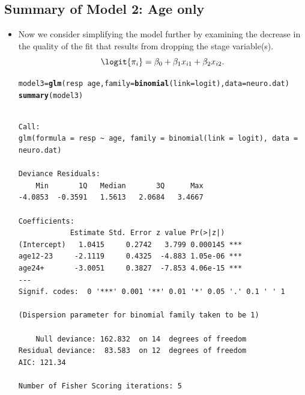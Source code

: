\documentclass[oneside]{book}\usepackage[]{graphicx}\usepackage[svgnames]{xcolor}
\makeatletter
\newcommand{\hlopt}[1]{\textcolor[rgb]{0,0,0}{#1}}%
\newcommand{\hlstd}[1]{\textcolor[rgb]{0.345,0.345,0.345}{#1}}%
\newcommand{\hlkwb}[1]{\textcolor[rgb]{0.69,0.353,0.396}{#1}}%
\newcommand{\hlkwc}[1]{\textcolor[rgb]{0.333,0.667,0.333}{#1}}%
\newcommand{\hlkwd}[1]{\textcolor[rgb]{0.737,0.353,0.396}{\textbf{#1}}}%
\newenvironment{kframe}{%
 \def\at@end@of@kframe{}%
 \ifinner\ifhmode%
  \def\at@end@of@kframe{\end{minipage}}%
  \begin{minipage}{\columnwidth}%
 \fi\fi%
 \def\FrameCommand##1{\hskip\@totalleftmargin \hskip-\fboxsep
 \colorbox{shadecolor}{##1}\hskip-\fboxsep
     \hskip-\linewidth \hskip-\@totalleftmargin \hskip\columnwidth}%
 \MakeFramed {\advance\hsize-\width
   \@totalleftmargin\z@ \linewidth\hsize
   \@setminipage}}%
 {\par\unskip\endMakeFramed%
 \at@end@of@kframe}
\newenvironment{knitrout}{}{} %
\makeatother
\begin{document}
\subsection*{Summary of Model 2: Age only}
\begin{itemize}
    \item Now we consider simplifying the model further by examining the decrease in
          the quality of the fit that results from dropping the stage variable(s).
          \[ \logit{\pi_i}=\beta_0+\beta_1x_{i1}+\beta_2x_{i2}. \]
\begin{knitrout}
\color{fgcolor}\begin{kframe}
\begin{alltt}
\hlstd{model3} \hlkwb{=} \hlkwd{glm}\hlstd{(resp} \hlopt{~} \hlstd{age,} \hlkwc{family} \hlstd{=} \hlkwd{binomial}\hlstd{(}\hlkwc{link} \hlstd{= logit),} \hlkwc{data} \hlstd{= neuro.dat)}
\hlkwd{summary}\hlstd{(model3)}
\end{alltt}
\begin{verbatim}

Call:
glm(formula = resp ~ age, family = binomial(link = logit), data = neuro.dat)

Deviance Residuals: 
    Min       1Q   Median       3Q      Max  
-4.0853  -0.3591   1.5613   2.0684   3.4667  

Coefficients:
            Estimate Std. Error z value Pr(>|z|)    
(Intercept)   1.0415     0.2742   3.799 0.000145 ***
age12-23     -2.1119     0.4325  -4.883 1.05e-06 ***
age24+       -3.0051     0.3827  -7.853 4.06e-15 ***
---
Signif. codes:  0 '***' 0.001 '**' 0.01 '*' 0.05 '.' 0.1 ' ' 1

(Dispersion parameter for binomial family taken to be 1)

    Null deviance: 162.832  on 14  degrees of freedom
Residual deviance:  83.583  on 12  degrees of freedom
AIC: 121.34

Number of Fisher Scoring iterations: 5
\end{verbatim}
\end{kframe}
\end{knitrout}
\end{itemize}
\end{document}
